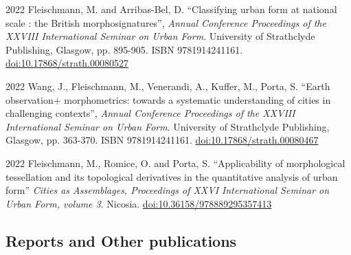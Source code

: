 \documentclass[12pt,a4paper]{report}
\begin{document}
    \begin{tablist}

        \item[2022] \tab{}Fleischmann, M. and Arribas-Bel, D. \enquote{Classifying urban form at national scale : the British morphosignatures}, \textit{Annual Conference Proceedings of the XXVIII International Seminar on Urban Form}. University of Strathclyde Publishing, Glasgow, pp. 895-905. ISBN 9781914241161. \href{https://doi.org/10.17868/strath.00080527}{doi:10.17868/strath.00080527}

        \item[2022] \tab{}Wang, J., Fleischmann, M., Venerandi, A., Kuffer, M., Porta, S. \enquote{Earth observation+ morphometrics: towards a systematic understanding of cities in challenging contexts}, \textit{Annual Conference Proceedings of the XXVIII International Seminar on Urban Form}. University of Strathclyde Publishing, Glasgow, pp. 363-370. ISBN 9781914241161. \href{https://doi.org/10.17868/strath.00080476}{doi:10.17868/strath.00080467}

        \item[2022] \tab{}Fleischmann, M., Romice, O. and Porta, S. \enquote{Applicability of morphological tessellation and its topological derivatives in the quantitative analysis of urban form} \textit{Cities as Assemblages, Proceedings of XXVI International Seminar on Urban Form, volume 3}. Nicosia. \href{https://doi.org/10.36158/978889295357413}{doi:10.36158/978889295357413}

    \end{tablist}

    \subsection*{Reports and Other publications}
\end{document}
